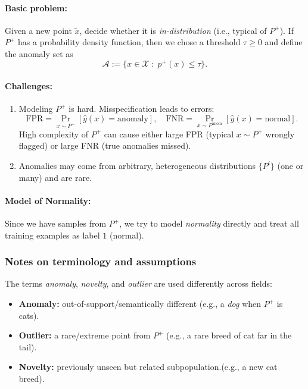 \documentclass[11pt]{article}
\theoremstyle{plain}
\begin{document}
\paragraph{Basic problem:}
Given a new point $\tilde x$, decide whether it is \emph{in-distribution} (i.e., typical of $P^{+}$).
If $P^{+}$ has a probability density function, then we chose a threshold $\tau\ge 0$ and define the anomaly set as
\[
  \mathcal A := \{x\in\mathcal X \;:\; p^{+}(x)\le \tau\}.
\]

\paragraph{Challenges:}
\begin{enumerate}
  \item Modeling $P^{+}$ is hard. Misspecification leads to errors:
  \[
    \text{FPR}=\Pr_{x\sim P^{+}}[\hat y(x)=\text{anomaly}],\quad
    \text{FNR}=\Pr_{x\sim P^{\text{anom}}}[\hat y(x)=\text{normal}].
  \]
  High complexity of $P^{+}$ can cause either large FPR (typical $x\sim P^{+}$ wrongly flagged) or large FNR (true anomalies missed).
  \item Anomalies may come from arbitrary, heterogeneous distributions $\{P^{i}\}$ (one or many) and are rare.
\end{enumerate}

\paragraph{Model of Normality:}
Since we have samples from $P^{
+
}$, we try to model \emph{normality} directly and treat all training examples as label $1$ (normal).

\subsubsection{Notes on terminology and assumptions}
The terms \emph{anomaly}, \emph{novelty}, and \emph{outlier} are used differently across fields:
\begin{itemize}
  \item \textbf{Anomaly:} out-of-support/semantically different (e.g., a \emph{dog} when $P^{+}$ is cats).
  \item \textbf{Outlier:} a rare/extreme point from $P^{+}$ (e.g., a rare breed of cat far in the tail).
  \item \textbf{Novelty:} previously unseen but related subpopulation.(e.g., a new cat breed).
\end{itemize}
\end{document}
